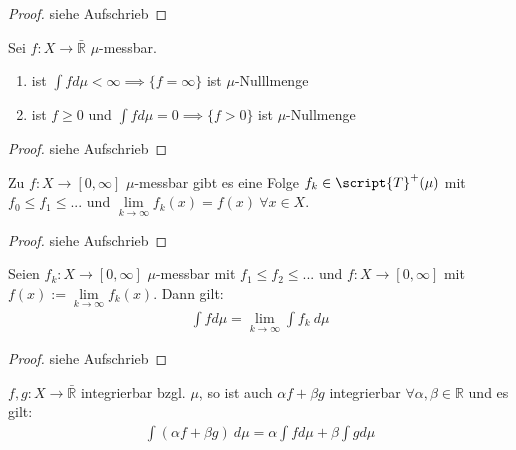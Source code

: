   \begin{proof}
    siehe Aufschrieb
  \end{proof}

  \begin{lemma}
    Sei $f: X \to \bar{\mathbb{R}}$ $\mu$-messbar.
    \begin{enumerate}[label=\roman*)]
      \item ist $\int f d\mu < \infty \implies \{f = \infty\}$ ist $\mu$-Nulllmenge
      \item ist $f \geq 0$ und $\int f d\mu = 0 \implies \{f > 0\}$ ist $\mu$-Nullmenge
    \end{enumerate}
  \end{lemma}

  \begin{proof}
    siehe Aufschrieb
  \end{proof}

  \begin{theorem}
    Zu $f: X \to [0,\infty]$ $\mu$-messbar gibt es eine Folge $f_k \in \script{T}^+(\mu)$ mit $f_0 \leq f_1 \leq ...$ und $\lim\limits_{k \to \infty} f_k(x) = f(x) \ \forall x \in X$.
  \end{theorem}

  \begin{proof}
    siehe Aufschrieb
  \end{proof}

  \begin{theorem}
    Seien $f_k:X \to [0,\infty]$ $\mu$-messbar mit $f_1 \leq f_2 \leq ...$ und $f: X \to [0, \infty]$ mit $f(x) := \lim\limits_{k \to \infty} f_k(x)$. Dann gilt:
    \begin{align*}
      \int f d\mu = \lim\limits_{k \to \infty} \int f_k \ d\mu
    \end{align*}
  \end{theorem}

  \begin{proof}
    siehe Aufschrieb
  \end{proof}

  \begin{theorem}
    $f,g: X \to \bar{\mathbb{R}}$ integrierbar bzgl. $\mu$, so ist auch $\alpha f + \beta g$ integrierbar $\forall \alpha, \beta \in \mathbb{R}$ und es gilt:
    \begin{align*}
      \int (\alpha f + \beta g) \ d\mu = \alpha \int f d\mu + \beta \int g d\mu
    \end{align*}
  \end{theorem}

